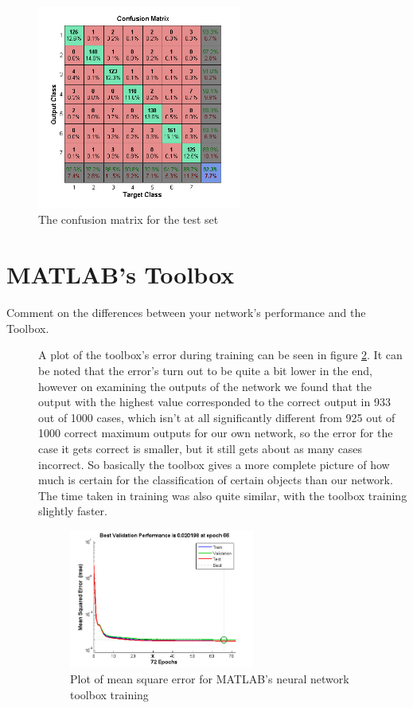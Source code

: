 \begin{description}[style=unboxed]
    \begin{figure}[h!]
  \centering
    \includegraphics[width=0.6\textwidth]{images/confusionmatrix.png}
    \caption{The confusion matrix for the test set}
    \label{confusion}
\end{figure}
\end{description}

\section{MATLAB's Toolbox}
\begin{description}
    \item[Comment on the differences between your network's performance and the Toolbox.]
    A plot of the toolbox's error during training can be seen in figure \ref{toolbox}. It can be noted that the error's turn out to be quite a bit lower in the end, however on examining the outputs of the network we found that the output with the highest value corresponded to the correct output in 933 out of 1000 cases, which isn't at all significantly different from 925 out of 1000 correct maximum outputs for our own network, so the error for the case it gets correct is smaller, but it still gets about as many cases incorrect. So basically the toolbox gives a more complete picture of how much is certain for the classification of certain objects than our network. The time taken in training was also quite similar, with the toolbox training slightly faster.
    \begin{figure}[h!]
  \centering
    \includegraphics[width=0.6\textwidth]{images/toolboxErrorPlot.png}
    \caption{Plot of mean square error for MATLAB's neural network toolbox training}
    \label{toolbox}
\end{figure}
\end{description}
    
